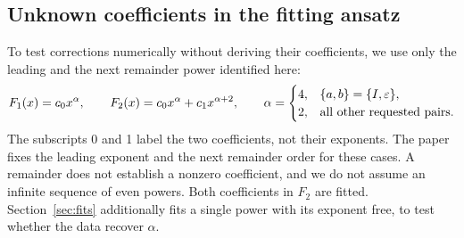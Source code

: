 \subsection{Unknown coefficients in the fitting ansatz}
To test corrections numerically without deriving their coefficients,
we use only the leading and the next remainder power identified here:
\begin{equation}
 F_1(x)=c_0x^\alpha,\qquad F_2(x)=c_0x^\alpha+c_1x^{\alpha+2},
 \qquad
 \alpha=\begin{cases}
 4,&\{a,b\}=\{I,\varepsilon\},\\
 2,&\text{all other requested pairs}.
 \end{cases}
 \label{eq:hierarchy}
\end{equation}
The subscripts 0 and 1 label the two coefficients, not their exponents.
The paper fixes the leading exponent and the next remainder order for
these cases. A remainder does not establish a nonzero coefficient, and
we do not assume an infinite sequence of even powers. Both coefficients
in $F_2$ are fitted. Section~\ref{sec:fits} additionally fits a single
power with its exponent free, to test whether the data recover $\alpha$.

